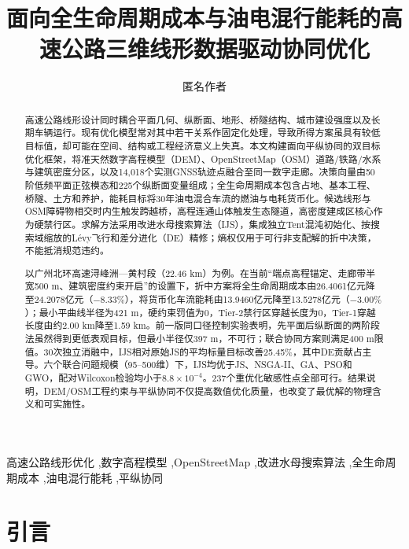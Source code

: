 \documentclass[preprint,12pt]{elsarticle}
\begin{document}
\begin{frontmatter}

\title{面向全生命周期成本与油电混行能耗的高速公路三维线形数据驱动协同优化}

\author[aff1]{匿名作者}

\begin{abstract}
高速公路线形设计同时耦合平面几何、纵断面、地形、桥隧结构、城市建设强度以及长期车辆运行。现有优化模型常对其中若干关系作固定化处理，导致所得方案虽具有较低目标值，却可能在空间、结构或工程经济意义上失真。本文构建面向平纵协同的双目标优化框架，将准天然数字高程模型（DEM）、OpenStreetMap（OSM）道路/铁路/水系与建筑密度分区，以及14,018个实测GNSS轨迹点融合至同一数字走廊。决策向量由50阶低频平面正弦模态和225个纵断面变量组成；全生命周期成本包含占地、基本工程、桥隧、土方和养护，能耗目标将30年油电混合车流的燃油与电耗货币化。候选线形与OSM障碍物相交时内生触发跨越桥，高程连通山体触发生态隧道，高密度建成区核心作为硬禁行区。求解方法采用改进水母搜索算法（IJS），集成独立Tent混沌初始化、按搜索域缩放的L\'evy飞行和差分进化（DE）精修；熵权仅用于可行非支配解的折中决策，不能抵消规范违约。

以广州北环高速浔峰洲—黄村段（22.46 km）为例。在当前“端点高程锚定、走廊带半宽500 m、建筑密度约束开启”的设置下，折中方案将全生命周期成本由26.4061亿元降至24.2078亿元（$-8.33\%$），将货币化车流能耗由13.9460亿元降至13.5278亿元（$-3.00\%$）；最小平曲线半径为421 m，硬约束罚值为0，Tier-2禁行区穿越长度为0，Tier-1穿越长度由约2.00 km降至1.59 km。前一版同口径控制实验表明，先平面后纵断面的两阶段法虽然得到更低表观目标，但最小半径仅397 m，不可行；联合协同方案则满足400 m限值。30次独立消融中，IJS相对原始JS的平均标量目标改善25.45\%，其中DE贡献占主导。六个联合问题规模（95--500维）下，IJS均优于JS、NSGA-II、GA、PSO和GWO，配对Wilcoxon检验均小于$8.8\times10^{-4}$。237个重优化敏感性点全部可行。结果说明，DEM/OSM工程约束与平纵协同不仅提高数值优化质量，也改变了最优解的物理含义和可实施性。
\end{abstract}

\begin{keyword}
高速公路线形优化 \sep 数字高程模型 \sep OpenStreetMap \sep 改进水母搜索算法 \sep 全生命周期成本 \sep 油电混行能耗 \sep 平纵协同
\end{keyword}
\end{frontmatter}

\linenumbers

\section{引言}
\end{document}
